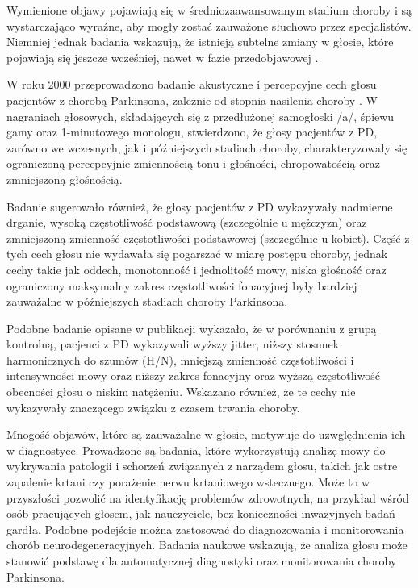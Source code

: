 Wymienione objawy pojawiają się w średniozaawansowanym stadium choroby i są wystarczająco wyraźne, aby mogły zostać zauważone słuchowo przez specjalistów.
Niemniej jednak badania wskazują, że istnieją subtelne zmiany w głosie, które pojawiają się jeszcze wcześniej, nawet w fazie przedobjawowej \cite{2023_PD_voice}.

W roku 2000 przeprowadzono badanie akustyczne i percepcyjne cech głosu pacjentów z chorobą Parkinsona, zależnie od stopnia nasilenia choroby \cite{holmes}.
W nagraniach głosowych, składających się z przedłużonej samogłoski /a/, śpiewu gamy oraz 1-minutowego monologu, stwierdzono, że głosy pacjentów z PD,
zarówno we wczesnych, jak i późniejszych stadiach choroby, charakteryzowały się ograniczoną percepcyjnie zmiennością tonu i głośności, chropowatością
oraz zmniejszoną głośnością.

Badanie sugerowało również, że głosy pacjentów z PD wykazywały nadmierne drganie, wysoką częstotliwość podstawową (szczególnie u mężczyzn) oraz zmniejszoną zmienność częstotliwości podstawowej (szczególnie u kobiet).
Część z tych cech głosu nie wydawała się pogarszać w miarę postępu choroby, jednak cechy takie jak oddech, monotonność i jednolitość mowy, niska głośność oraz ograniczony maksymalny zakres częstotliwości fonacyjnej były bardziej zauważalne w późniejszych stadiach choroby Parkinsona.

Podobne badanie opisane w publikacji \cite{GAMBOA1997314} wykazało, że w porównaniu z grupą kontrolną, pacjenci z PD wykazywali wyższy jitter, niższy
stosunek harmonicznych do szumów (H/N), mniejszą zmienność częstotliwości i intensywności mowy oraz niższy zakres fonacyjny oraz wyższą częstotliwość
obecności głosu o niskim natężeniu.
Wskazano również, że te cechy nie wykazywały znaczącego związku z czasem trwania choroby.

Mnogość objawów, które są zauważalne w głosie, motywuje do uzwględnienia ich w diagnostyce.
Prowadzone są badania, które wykorzystują analizę mowy do wykrywania patologii i schorzeń związanych z narządem głosu, takich jak ostre zapalenie krtani czy porażenie nerwu krtaniowego wstecznego.
Może to w przyszłości pozwolić na identyfikację problemów zdrowotnych, na przykład wśród osób pracujących głosem, jak nauczyciele, bez konieczności inwazyjnych badań gardła.
Podobne podejście można zastosować do diagnozowania i monitorowania chorób neurodegeneracyjnych.
Badania naukowe wskazują, że analiza głosu może stanowić podstawę dla automatycznej diagnostyki oraz monitorowania choroby Parkinsona.

